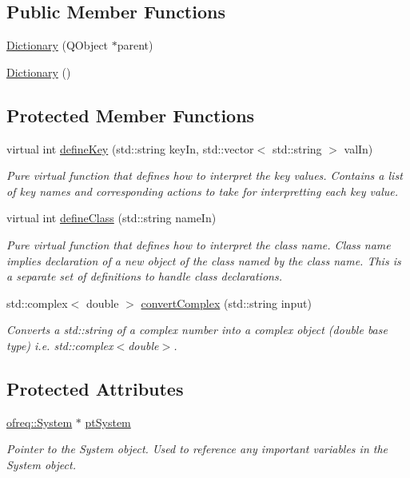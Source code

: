 \subsection*{Public Member Functions}
\begin{DoxyCompactItemize}
\item 
\hyperlink{classosea_1_1_dictionary_a6ff9dd5005c8796e0cc13a8bc4cb2288}{Dictionary} (Q\-Object $\ast$parent)
\item 
\hyperlink{classosea_1_1_dictionary_aee8d612bc9d323c38faba045ba384b8b}{Dictionary} ()
\end{DoxyCompactItemize}
\subsection*{Protected Member Functions}
\begin{DoxyCompactItemize}
\item 
virtual int \hyperlink{classosea_1_1_dictionary_ae96470181c8b1762204493fa45e96d7c}{define\-Key} (std\-::string key\-In, std\-::vector$<$ std\-::string $>$ val\-In)
\begin{DoxyCompactList}\small\item\em Pure virtual function that defines how to interpret the key values. Contains a list of key names and corresponding actions to take for interpretting each key value. \end{DoxyCompactList}\item 
virtual int \hyperlink{classosea_1_1_dictionary_a42843f64aa966b8c686d9e3750cbdb4b}{define\-Class} (std\-::string name\-In)
\begin{DoxyCompactList}\small\item\em Pure virtual function that defines how to interpret the class name. Class name implies declaration of a new object of the class named by the class name. This is a separate set of definitions to handle class declarations. \end{DoxyCompactList}\item 
std\-::complex$<$ double $>$ \hyperlink{classosea_1_1_dictionary_ac714952a7fcf99ab69de015c606322ad}{convert\-Complex} (std\-::string input)
\begin{DoxyCompactList}\small\item\em Converts a std\-::string of a complex number into a complex object (double base type) i.\-e. std\-::complex$<$double$>$. \end{DoxyCompactList}\end{DoxyCompactItemize}
\subsection*{Protected Attributes}
\begin{DoxyCompactItemize}
\item 
\hyperlink{classosea_1_1ofreq_1_1_system}{ofreq\-::\-System} $\ast$ \hyperlink{classosea_1_1_dictionary_a72bf4127a7ee1fb2b784abb6df020fed}{pt\-System}
\begin{DoxyCompactList}\small\item\em Pointer to the System object. Used to reference any important variables in the System object. \end{DoxyCompactList}\end{DoxyCompactItemize}
